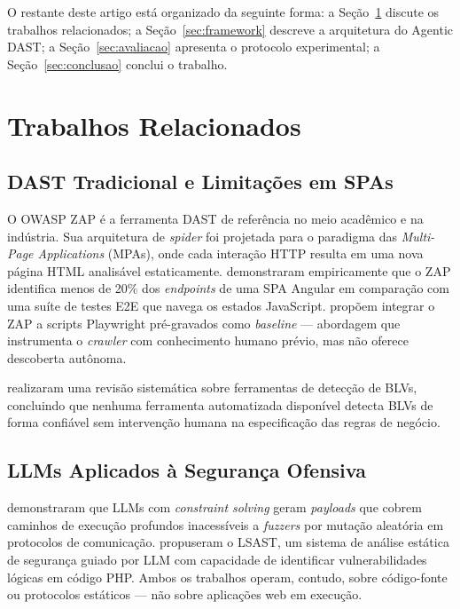 \documentclass[
    10pt,
    twocolumn,
    a4paper
]{article}
\begin{document}
O restante deste artigo está organizado da seguinte forma: a
Seção~\ref{sec:relacionados} discute os trabalhos relacionados;
a Seção~\ref{sec:framework} descreve a arquitetura do Agentic DAST;
a Seção~\ref{sec:avaliacao} apresenta o protocolo experimental;
a Seção~\ref{sec:conclusao} conclui o trabalho.

\section{Trabalhos Relacionados}
\label{sec:relacionados}

\subsection{DAST Tradicional e Limitações em SPAs}

O OWASP ZAP \cite{owaspzap} é a ferramenta DAST de referência no meio
acadêmico e na indústria. Sua arquitetura de \textit{spider} foi
projetada para o paradigma das \textit{Multi-Page Applications} (MPAs),
onde cada interação HTTP resulta em uma nova página HTML analisável
estaticamente.  demonstraram empiricamente que
o ZAP identifica menos de 20\% dos \textit{endpoints} de uma SPA Angular
em comparação com uma suíte de testes E2E que navega os estados
JavaScript.  propõem integrar o ZAP a scripts
Playwright pré-gravados como \textit{baseline} --- abordagem que
instrumenta o \textit{crawler} com conhecimento humano prévio, mas não
oferece descoberta autônoma.

 realizaram uma revisão sistemática sobre
ferramentas de detecção de BLVs, concluindo que nenhuma ferramenta
automatizada disponível detecta BLVs de forma confiável sem intervenção
humana na especificação das regras de negócio.

\subsection{LLMs Aplicados à Segurança Ofensiva}

 demonstraram que LLMs com
\textit{constraint solving} geram \textit{payloads} que cobrem caminhos
de execução profundos inacessíveis a \textit{fuzzers} por mutação
aleatória em protocolos de comunicação. 
propuseram o LSAST, um sistema de análise estática de segurança guiado
por LLM com capacidade de identificar vulnerabilidades lógicas em código
PHP. Ambos os trabalhos operam, contudo, sobre código-fonte ou protocolos
estáticos --- não sobre aplicações web em execução.
\end{document}

